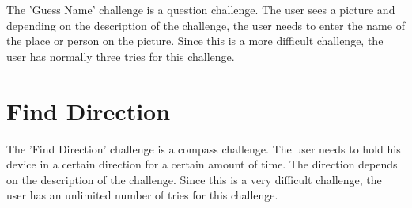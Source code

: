 The 'Guess Name' challenge is a question challenge. The user sees a picture and depending on the description of the challenge, the user needs to enter the name of the place or person on the picture. Since this is a more difficult challenge, the user has normally three tries for this challenge.

\section{Find Direction}

The 'Find Direction' challenge is a compass challenge. The user needs to hold his device in a certain direction for a certain amount of time. The direction depends on the description of the challenge. Since this is a very difficult challenge, the user has an unlimited number of tries for this challenge.

